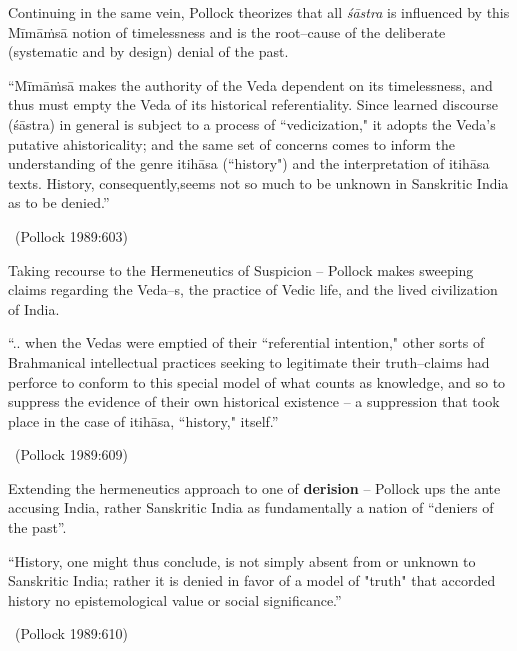 Continuing in the same vein, Pollock theorizes that all \textit{śāstra} is influenced by this Mīmāṁsā notion of timelessness and is the root–cause of the deliberate (systematic and by design) denial of the past.

\begin{myquote}
“Mīmāṁsā makes the authority of the Veda dependent on its timelessness, and thus must empty the Veda of its historical referentiality. Since learned discourse (śāstra) in general is subject to a process of “vedicization," it adopts the Veda's putative ahistoricality; and the same set of concerns comes to inform the understanding of the genre itihāsa (“history") and the interpretation of itihāsa texts. History, consequently,\break seems not so much to be unknown in Sanskritic India as to be denied.”

~\hfill (Pollock 1989:603)
\end{myquote}

Taking recourse to the Hermeneutics of Suspicion – Pollock makes sweeping claims regarding the Veda–s, the practice of Vedic life, and the lived civilization of India.

\begin{myquote}
“.. when the Vedas were emptied of their “referential intention," other sorts of Brahmanical intellectual practices seeking to legitimate their truth–claims had perforce to conform to this special model of what counts as knowledge, and so to suppress the evidence of their own historical existence – a suppression that took place in the case of itihāsa, “history," itself.”

~\hfill (Pollock 1989:609)
\end{myquote}

Extending the hermeneutics approach to one of \textbf{derision }– Pollock ups the ante accusing India, rather Sanskritic India as fundamentally a nation of “deniers of the past”.

\begin{myquote}
“History, one might thus conclude, is not simply absent from or unknown to Sanskritic India; rather it is denied in favor of a model of "truth" that accorded history no epistemological value or social significance.”

~\hfill (Pollock 1989:610)
\end{myquote}

